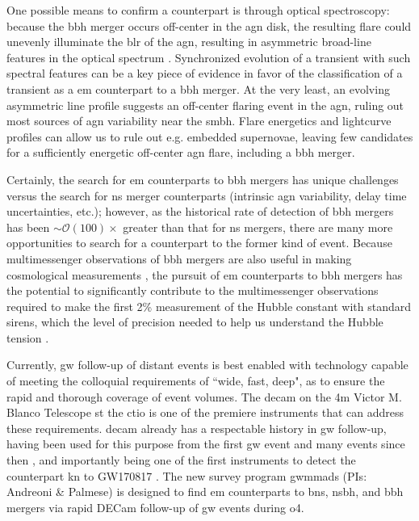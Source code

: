 \documentclass[twocolumn]{aastex631}
\begin{document}
One possible means to confirm a counterpart is through optical spectroscopy: because the \gls{bbh} merger occurs off-center in the \gls{agn} disk, the resulting flare could unevenly illuminate the \gls{blr} of the \gls{agn}, resulting in asymmetric broad-line features in the optical spectrum \citep{mckernanRampressureStrippingKicked2019}.
Synchronized evolution of a transient with such spectral features can be a key piece of evidence in favor of the classification of a transient as a \gls{em} counterpart to a \gls{bbh} merger.
At the very least, an evolving asymmetric line profile suggests an off-center flaring event in the \gls{agn}, ruling out most sources of \gls{agn} variability near the \gls{smbh}.
Flare energetics and lightcurve profiles can allow us to rule out e.g. embedded supernovae, leaving few candidates for a sufficiently energetic off-center \gls{agn} flare, including a \gls{bbh} merger.

Certainly, the search for \gls{em} counterparts to \gls{bbh} mergers has unique challenges versus the search for \gls{ns} merger counterparts (intrinsic \gls{agn} variability, delay time uncertainties, etc.); however, as the historical rate of detection of \gls{bbh} mergers has been $\sim\mathcal{O}(100)\times$ greater than that for \gls{ns} mergers, there are many more opportunities to search for a counterpart to the former kind of event.
Because multimessenger observations of \gls{bbh} mergers are also useful in making cosmological measurements \citep{palmeseLIGOVirgoBlack2021,bomStandardSirenCosmology2023,Alves_2024}, the pursuit of \gls{em} counterparts to \gls{bbh} mergers has the potential to significantly contribute to the multimessenger observations required to make the first 2\% measurement of the Hubble constant with standard sirens, which the level of precision needed to help us understand the Hubble tension \citep{chenTwoCentHubble2018}.

Currently, \gls{gw} follow-up of distant events is best enabled with technology capable of meeting the colloquial requirements of ``wide, fast, deep", as to ensure the rapid and thorough coverage of event volumes.
The \gls{decam} \citep{flaugherDarkEnergyCamera2015} on the 4m Victor M. Blanco Telescope st the \gls{ctio} is one of the premiere instruments that can address these requirements.
\gls{decam} already has a respectable history in \gls{gw} follow-up, having been used for this purpose from the first \gls{gw} event \citep{soares-santosDARKENERGYCAMERA2016, annisDARKENERGYCAMERA2016} and many events since then \citep{goldsteinGROWTHS190426cRealtime2019a,andreoniGROWTHS190510gDECam2019a,hernerOpticalFollowupGravitational2020,andreoniGROWTHS190814bvDeep2020,morganConstraintsPhysicalProperties2020,garciaDESGWSearchElectromagnetic2020}, and importantly being one of the first instruments to detect the counterpart \gls{kn} to GW170817 \citep{soares-santosElectromagneticCounterpartBinary2017}.
The new survey program \gls{gwmmads} (PIs: Andreoni \& Palmese) is designed to find \gls{em} counterparts to \gls{bns}, \gls{ns}\gls{bh}, and \gls{bbh} mergers via rapid DECam follow-up of \gls{gw} events during \gls{o4}.
\end{document}
